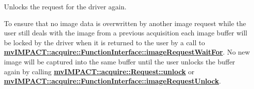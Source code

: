 Unlocks the request for the driver again. 

To ensure that no image data is overwritten by another image request while the user still deals with the image from a previous acquisition each image buffer will be locked by the driver when it is returned to the user by a call to {\bfseries \hyperlink{classmv_i_m_p_a_c_t_1_1acquire_1_1_function_interface_a4cefdfda8e8940736ae9a4c97b6de8c9}{mv\+I\+M\+P\+A\+C\+T\+::acquire\+::\+Function\+Interface\+::image\+Request\+Wait\+For}}. No new image will be captured into the same buffer until the user unlocks the buffer again by calling {\bfseries \hyperlink{classmv_i_m_p_a_c_t_1_1acquire_1_1_request_a3c30ced407d20caef49e3148257cd91e}{mv\+I\+M\+P\+A\+C\+T\+::acquire\+::\+Request\+::unlock}} or {\bfseries \hyperlink{classmv_i_m_p_a_c_t_1_1acquire_1_1_function_interface_a378a338217d5a681e880a0d9395f1a62}{mv\+I\+M\+P\+A\+C\+T\+::acquire\+::\+Function\+Interface\+::image\+Request\+Unlock}}.

